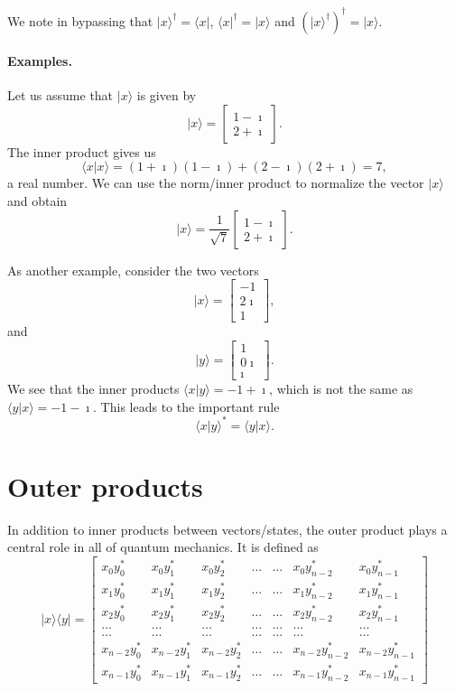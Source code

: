 We note in bypassing that $\vert x\rangle^{\dagger}=\langle x \vert$,
$\langle x\vert^{\dagger}=\vert x\rangle$ and $(\vert
x\rangle^{\dagger})^{\dagger}=\vert x \rangle$.

\paragraph{Examples.}
Let us assume that $\vert x \rangle$ is given by
\[
\vert x \rangle = \begin{bmatrix} 1-\imath \\ 2+\imath \end{bmatrix}.
\]
The inner product gives us
\[
\langle x\vert x \rangle = (1+\imath)(1-\imath)+(2-\imath)(2+\imath)=7,
\]
a real number.
We can use the norm/inner product to normalize the vector $\vert x \rangle$ and obtain
\[
\vert x \rangle = \frac{1}{\sqrt{7}}\begin{bmatrix} 1-\imath \\ 2+\imath \end{bmatrix}.
\]

As another example, consider the two vectors
\[
\vert x \rangle = \begin{bmatrix} -1 \\ 2\imath \\ 1\end{bmatrix},
\]
and
\[
\vert y \rangle = \begin{bmatrix} 1 \\ 0\imath \\ \imath\end{bmatrix}.
\]
We see that the inner products $\langle x\vert y \rangle = -1+\imath$, which is not the same as
$\langle y\vert x \rangle = -1-\imath$. This leads to the important rule
\[
\langle x\vert y\rangle^* = \langle y \vert x\rangle. 
\]

\section{Outer products}

In addition to inner products between vectors/states, the outer
product plays a central role in all of quantum mechanics. It is
defined as
\[
\vert x\rangle \langle y \vert = \begin{bmatrix}
               x_0y_0^* & x_0y_1^* & x_0y_2^* & \dots & \dots & x_0y_{n-2}^* & x_0y_{n-1}^* \\
	       x_1y_0^* & x_1y_1^* & x_1y_2^* & \dots & \dots & x_1y_{n-2}^* & x_1y_{n-1}^* \\
	       x_2y_0^* & x_2y_1^* & x_2y_2^* & \dots & \dots & x_2y_{n-2}^* & x_2y_{n-1}^* \\	       
               \dots &   \dots   & \dots  & \dots & \dots & \dots & \dots \\
               \dots &   \dots   & \dots  & \dots & \dots & \dots & \dots \\	       
	       x_{n-2}y_0^* & x_{n-2}y_1^* & x_{n-2}y_2^* & \dots & \dots & x_{n-2}y_{n-2}^* & x_{n-2}y_{n-1}^* \\
	       x_{n-1}y_0^* & x_{n-1}y_1^* & x_{n-1}y_2^* & \dots & \dots & x_{n-1}y_{n-2}^* & x_{n-1}y_{n-1}^* \end{bmatrix}	       
\]

